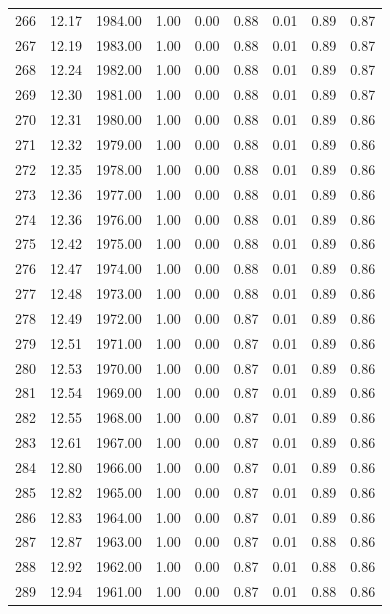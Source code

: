 \documentclass{article}\usepackage[]{graphicx}\usepackage[]{color}
\begin{document}
\begin{longtable}{rrrrrrrrr}
  266 & 12.17 & 1984.00 & 1.00 & 0.00 & 0.88 & 0.01 & 0.89 & 0.87 \\ 
  267 & 12.19 & 1983.00 & 1.00 & 0.00 & 0.88 & 0.01 & 0.89 & 0.87 \\ 
  268 & 12.24 & 1982.00 & 1.00 & 0.00 & 0.88 & 0.01 & 0.89 & 0.87 \\ 
  269 & 12.30 & 1981.00 & 1.00 & 0.00 & 0.88 & 0.01 & 0.89 & 0.87 \\ 
  270 & 12.31 & 1980.00 & 1.00 & 0.00 & 0.88 & 0.01 & 0.89 & 0.86 \\ 
  271 & 12.32 & 1979.00 & 1.00 & 0.00 & 0.88 & 0.01 & 0.89 & 0.86 \\ 
  272 & 12.35 & 1978.00 & 1.00 & 0.00 & 0.88 & 0.01 & 0.89 & 0.86 \\ 
  273 & 12.36 & 1977.00 & 1.00 & 0.00 & 0.88 & 0.01 & 0.89 & 0.86 \\ 
  274 & 12.36 & 1976.00 & 1.00 & 0.00 & 0.88 & 0.01 & 0.89 & 0.86 \\ 
  275 & 12.42 & 1975.00 & 1.00 & 0.00 & 0.88 & 0.01 & 0.89 & 0.86 \\ 
  276 & 12.47 & 1974.00 & 1.00 & 0.00 & 0.88 & 0.01 & 0.89 & 0.86 \\ 
  277 & 12.48 & 1973.00 & 1.00 & 0.00 & 0.88 & 0.01 & 0.89 & 0.86 \\ 
  278 & 12.49 & 1972.00 & 1.00 & 0.00 & 0.87 & 0.01 & 0.89 & 0.86 \\ 
  279 & 12.51 & 1971.00 & 1.00 & 0.00 & 0.87 & 0.01 & 0.89 & 0.86 \\ 
  280 & 12.53 & 1970.00 & 1.00 & 0.00 & 0.87 & 0.01 & 0.89 & 0.86 \\ 
  281 & 12.54 & 1969.00 & 1.00 & 0.00 & 0.87 & 0.01 & 0.89 & 0.86 \\ 
  282 & 12.55 & 1968.00 & 1.00 & 0.00 & 0.87 & 0.01 & 0.89 & 0.86 \\ 
  283 & 12.61 & 1967.00 & 1.00 & 0.00 & 0.87 & 0.01 & 0.89 & 0.86 \\ 
  284 & 12.80 & 1966.00 & 1.00 & 0.00 & 0.87 & 0.01 & 0.89 & 0.86 \\ 
  285 & 12.82 & 1965.00 & 1.00 & 0.00 & 0.87 & 0.01 & 0.89 & 0.86 \\ 
  286 & 12.83 & 1964.00 & 1.00 & 0.00 & 0.87 & 0.01 & 0.89 & 0.86 \\ 
  287 & 12.87 & 1963.00 & 1.00 & 0.00 & 0.87 & 0.01 & 0.88 & 0.86 \\ 
  288 & 12.92 & 1962.00 & 1.00 & 0.00 & 0.87 & 0.01 & 0.88 & 0.86 \\ 
  289 & 12.94 & 1961.00 & 1.00 & 0.00 & 0.87 & 0.01 & 0.88 & 0.86 \\ 

\end{longtable}
\end{document}
